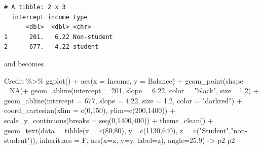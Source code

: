 \documentclass[
  letterpaper,
  DIV=11,
  numbers=noendperiod]{scrreprt}
\newenvironment{Shaded}{\begin{snugshade}}{\end{snugshade}}
\newcommand{\AttributeTok}[1]{\textcolor[rgb]{0.65,0.35,0.00}{#1}}
\newcommand{\ConstantTok}[1]{\textcolor[rgb]{0.85,0.12,0.09}{#1}}
\newcommand{\DecValTok}[1]{\textcolor[rgb]{0.47,0.16,0.63}{#1}}
\newcommand{\FloatTok}[1]{\textcolor[rgb]{0.65,0.35,0.00}{#1}}
\newcommand{\FunctionTok}[1]{\textcolor[rgb]{0.02,0.16,0.49}{#1}}
\newcommand{\NormalTok}[1]{\textcolor[rgb]{0.33,0.33,0.33}{#1}}
\newcommand{\OtherTok}[1]{\textcolor[rgb]{0.85,0.12,0.09}{#1}}
\newcommand{\SpecialCharTok}[1]{\textcolor[rgb]{0.00,0.46,0.62}{#1}}
\newcommand{\StringTok}[1]{\textcolor[rgb]{0.00,0.50,0.00}{#1}}
\begin{document}
\begin{verbatim}
# A tibble: 2 x 3
  intercept income type       
      <dbl>  <dbl> <chr>      
1      201.   6.22 Non-student
2      677.   4.22 student    
\end{verbatim}

and becomes

\begin{Shaded}
\begin{Highlighting}[]
\NormalTok{Credit }\SpecialCharTok{\%\textgreater{}\%} 
  \FunctionTok{ggplot}\NormalTok{() }\SpecialCharTok{+} \FunctionTok{aes}\NormalTok{(}\AttributeTok{x =}\NormalTok{ Income, }\AttributeTok{y =}\NormalTok{ Balance) }\SpecialCharTok{+} \FunctionTok{geom\_point}\NormalTok{(}\AttributeTok{shape =}\ConstantTok{NA}\NormalTok{)}\SpecialCharTok{+}
  \FunctionTok{geom\_abline}\NormalTok{(}\AttributeTok{intercept =} \DecValTok{201}\NormalTok{, }\AttributeTok{slope =} \FloatTok{6.22}\NormalTok{, }\AttributeTok{color =} \StringTok{"black"}\NormalTok{, }\AttributeTok{size =}\FloatTok{1.2}\NormalTok{) }\SpecialCharTok{+}
  \FunctionTok{geom\_abline}\NormalTok{(}\AttributeTok{intercept =} \DecValTok{677}\NormalTok{, }\AttributeTok{slope =} \FloatTok{4.22}\NormalTok{, }\AttributeTok{size =} \FloatTok{1.2}\NormalTok{, }\AttributeTok{color =} \StringTok{"darkred"}\NormalTok{) }\SpecialCharTok{+}  \FunctionTok{coord\_cartesian}\NormalTok{(}\AttributeTok{xlim =} \FunctionTok{c}\NormalTok{(}\DecValTok{0}\NormalTok{,}\DecValTok{150}\NormalTok{), }\AttributeTok{ylim=}\FunctionTok{c}\NormalTok{(}\DecValTok{200}\NormalTok{,}\DecValTok{1400}\NormalTok{)) }\SpecialCharTok{+} \FunctionTok{scale\_y\_continuous}\NormalTok{(}\AttributeTok{breaks =} \FunctionTok{seq}\NormalTok{(}\DecValTok{0}\NormalTok{,}\DecValTok{1400}\NormalTok{,}\DecValTok{400}\NormalTok{)) }\SpecialCharTok{+} \FunctionTok{theme\_clean}\NormalTok{() }\SpecialCharTok{+} \FunctionTok{geom\_text}\NormalTok{(}\AttributeTok{data =} \FunctionTok{tibble}\NormalTok{(}\AttributeTok{x =} \FunctionTok{c}\NormalTok{(}\DecValTok{80}\NormalTok{,}\DecValTok{80}\NormalTok{), }\AttributeTok{y =}\FunctionTok{c}\NormalTok{(}\DecValTok{1130}\NormalTok{,}\DecValTok{640}\NormalTok{), }\AttributeTok{z =} \FunctionTok{c}\NormalTok{(}\StringTok{"Student"}\NormalTok{,}\StringTok{"non{-}student"}\NormalTok{)), }\AttributeTok{inherit.aes =}\NormalTok{ F, }\FunctionTok{aes}\NormalTok{(}\AttributeTok{x=}\NormalTok{x, }\AttributeTok{y=}\NormalTok{y, }\AttributeTok{label=}\NormalTok{z), }\AttributeTok{angle=}\FloatTok{25.9}\NormalTok{) }\OtherTok{{-}\textgreater{}}\NormalTok{ p2}
\NormalTok{p2}
\end{Highlighting}
\end{Shaded}
\end{document}
